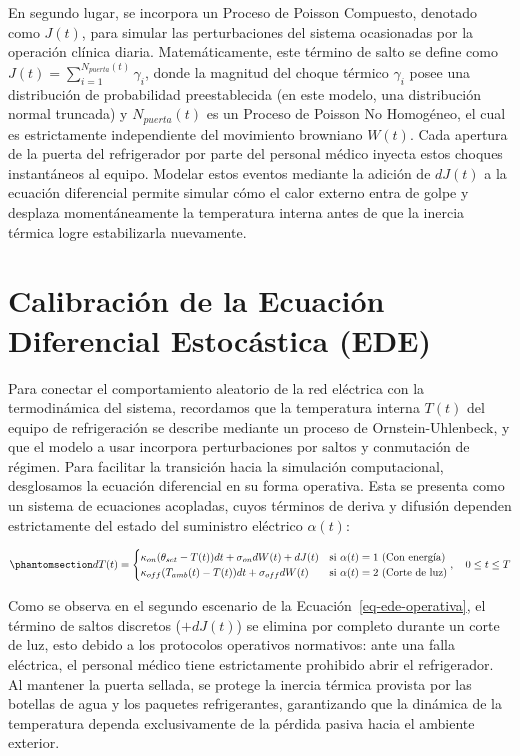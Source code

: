 \documentclass[
  spanish,
  letterpaper,
  DIV=11,
  numbers=noendperiod]{scrreprt}
\theoremstyle{plain}
\theoremstyle{plain}
\theoremstyle{plain}
\theoremstyle{definition}
\theoremstyle{remark}
\begin{document}
En segundo lugar, se incorpora un Proceso de Poisson Compuesto, denotado
como \(J(t)\), para simular las perturbaciones del sistema ocasionadas
por la operación clínica diaria. Matemáticamente, este término de salto
se define como \(J(t) = \sum_{i=1}^{N_{puerta}(t)} \gamma_i\), donde la
magnitud del choque térmico \(\gamma_i\) posee una distribución de
probabilidad preestablecida (en este modelo, una distribución normal
truncada) y \(N_{puerta}(t)\) es un Proceso de Poisson No Homogéneo, el
cual es estrictamente independiente del movimiento browniano \(W(t)\).
Cada apertura de la puerta del refrigerador por parte del personal
médico inyecta estos choques instantáneos al equipo. Modelar estos
eventos mediante la adición de \(dJ(t)\) a la ecuación diferencial
permite simular cómo el calor externo entra de golpe y desplaza
momentáneamente la temperatura interna antes de que la inercia térmica
logre estabilizarla nuevamente.

\section{Calibración de la Ecuación Diferencial Estocástica
(EDE)}\label{calibraciuxf3n-de-la-ecuaciuxf3n-diferencial-estocuxe1stica-ede}

Para conectar el comportamiento aleatorio de la red eléctrica con la
termodinámica del sistema, recordamos que la temperatura interna
\(T(t)\) del equipo de refrigeración se describe mediante un proceso de
Ornstein-Uhlenbeck, y que el modelo a usar incorpora perturbaciones por
saltos y conmutación de régimen. Para facilitar la transición hacia la
simulación computacional, desglosamos la ecuación diferencial en su
forma operativa. Esta se presenta como un sistema de ecuaciones
acopladas, cuyos términos de deriva y difusión dependen estrictamente
del estado del suministro eléctrico \(\alpha(t)\):

\begin{equation}\phantomsection\label{eq-ede-operativa}{
dT(t) = 
\begin{cases} 
\kappa_{on}(\theta_{set} - T(t))dt + \sigma_{on}dW(t) + dJ(t) & \text{si } \alpha(t) = 1 \text{ (Con energía)} \\ 
\kappa_{off}(T_{amb}(t) - T(t))dt + \sigma_{off}dW(t) & \text{si } \alpha(t) = 2 \text{ (Corte de luz)} 
\end{cases}, \quad 0 \leq t \leq T
}\end{equation}

Como se observa en el segundo escenario de la
Ecuación~\ref{eq-ede-operativa}, el término de saltos discretos
(\(+ dJ(t)\)) se elimina por completo durante un corte de luz, esto
debido a los protocolos operativos normativos: ante una falla eléctrica,
el personal médico tiene estrictamente prohibido abrir el refrigerador.
Al mantener la puerta sellada, se protege la inercia térmica provista
por las botellas de agua y los paquetes refrigerantes, garantizando que
la dinámica de la temperatura dependa exclusivamente de la pérdida
pasiva hacia el ambiente exterior.
\end{document}
